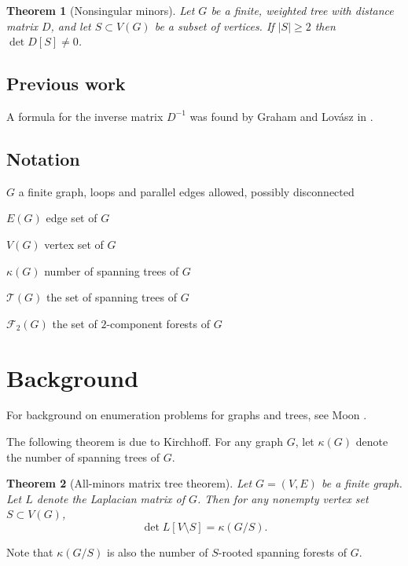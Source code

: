 \documentclass{amsart}
\newtheorem{thm}{Theorem}
\theoremstyle{definition}
\newcommand{\RR}{\mathbb{R}}
\newcommand{\trees}{\mathcal{T}}
\newcommand{\forests}{\mathcal{F}}
\begin{document}
\begin{thm}[Nonsingular minors]
Let $G$ be a finite, weighted tree
with distance matrix $D$,
and let $S \subset V(G)$ be a subset of vertices.
If $|S|\geq 2$ then $\det D[S] \neq 0$.
\end{thm}

\subsection{Previous work} 
A formula for the inverse matrix $D^{-1}$ was found by Graham and Lov\'{a}sz in \cite{graham-lovasz}.

\subsection{Notation}


$G$ a finite graph, 
loops and parallel edges allowed,
possibly disconnected

$E(G)$ edge set of $G$

$V(G)$ vertex set of $G$


$\kappa(G)$ number of spanning trees of $G$

$\trees(G)$ the set of spanning trees of $G$

$\forests_2(G)$ the set of $2$-component forests of $G$


\section{Background}

For background on enumeration problems for graphs and trees, see Moon \cite{moon}.



The following theorem is due to Kirchhoff.
For any graph $G$, let $\kappa(G)$ denote the number of spanning trees of $G$.
\begin{thm}[All-minors matrix tree theorem]
Let $G = (V,E)$ be a finite graph.
Let $L$ denote the Laplacian matrix of $G$.
Then for any nonempty vertex set $S \subset V(G)$,
\begin{equation}
\det L[V \setminus S] = \kappa( G / S) .
\end{equation}
\end{thm}
Note that $\kappa(G/S)$ is also the number of $S$-rooted spanning forests of $G$.
\end{document}
